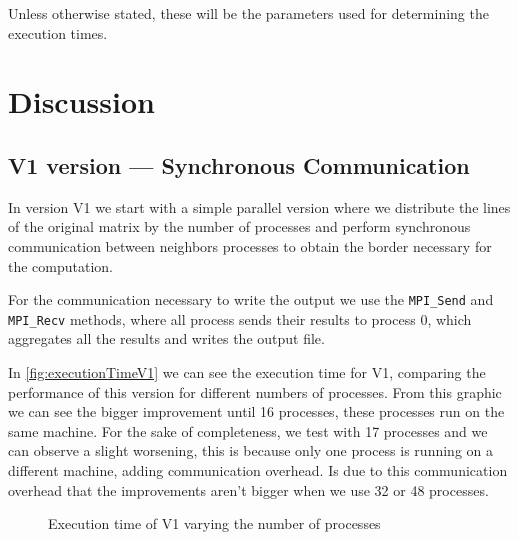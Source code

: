 \documentclass[conference]{IEEEtran}
\begin{document}
Unless otherwise stated, these will be the parameters used for determining the execution times.

\section{Discussion}

\subsection{V1 version --- Synchronous Communication}\label{sec:v1}

In version V1 we start with a simple parallel version where we distribute the lines of the original matrix by the number of processes and perform synchronous communication between neighbors processes to obtain the border necessary for the computation.

For the communication necessary to write the output we use the \texttt{MPI\_Send} and \texttt{MPI\_Recv} methods, where all process sends their results to process 0, which aggregates all the results and writes the output file.

In \autoref{fig:executionTimeV1} we can see the execution time for V1, comparing the performance of this version for different numbers of processes. From this graphic we can see the bigger improvement until 16 processes, these processes run on the same machine. For the sake of completeness, we test with 17 processes and we can observe a slight worsening, this is because only one process is running on a different machine, adding communication overhead. Is due to this communication overhead that the improvements aren't bigger when we use 32 or 48 processes.

\begin{figure}[ht]
  \centering
  \caption{Execution time of V1 varying the number of processes}
  \label{fig:executionTimeV1}
\end{figure}
\end{document}
